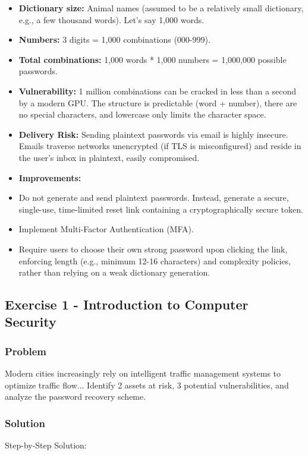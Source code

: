 \documentclass{article}
\begin{document}
\begin{itemize}
    \item \textbf{Dictionary size:} Animal names (assumed to be a relatively small dictionary, e.g., a few thousand words). Let's say 1,000 words.
    \item \textbf{Numbers:} 3 digits = 1,000 combinations (000-999).
    \item \textbf{Total combinations:} 1,000 words * 1,000 numbers = 1,000,000 possible passwords.
    \item \textbf{Vulnerability:} 1 million combinations can be cracked in less than a second by a modern GPU. The structure is predictable (word + number), there are no special characters, and lowercase only limits the character space.
    \item \textbf{Delivery Risk:} Sending plaintext passwords via email is highly insecure. Emails traverse networks unencrypted (if TLS is misconfigured) and reside in the user's inbox in plaintext, easily compromised.
    \item \textbf{Improvements:}
    \item[\textbf{1.}] Do not generate and send plaintext passwords. Instead, generate a secure, single-use, time-limited reset link containing a cryptographically secure token.
    \item[\textbf{2.}] Implement Multi-Factor Authentication (MFA).
    \item[\textbf{3.}] Require users to choose their own strong password upon clicking the link, enforcing length (e.g., minimum 12-16 characters) and complexity policies, rather than relying on a weak dictionary generation.
\end{itemize}

\subsection{Exercise 1 - Introduction to Computer Security}
\subsubsection*{Problem}
Modern cities increasingly rely on intelligent traffic management systems to optimize traffic flow... Identify 2 assets at risk, 3 potential vulnerabilities, and analyze the password recovery scheme.

\subsubsection*{Solution}
Step-by-Step Solution:
\end{document}
